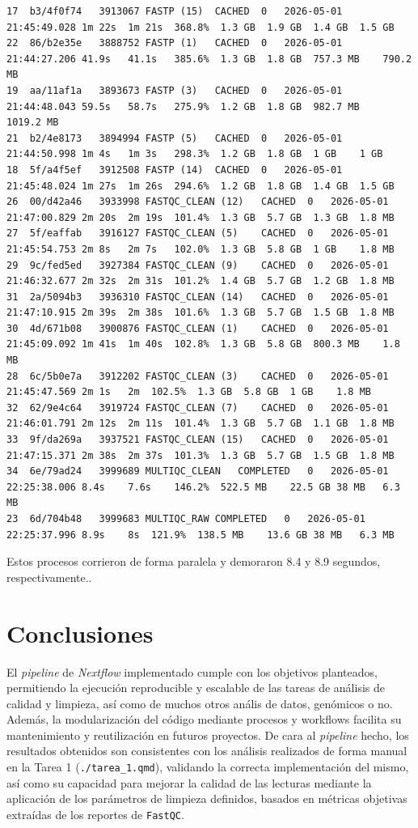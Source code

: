 \documentclass[
  letterpaper,
  DIV=11,
  numbers=noendperiod]{scrartcl}
\begin{document}
\begin{verbatim}
17  b3/4f0f74   3913067 FASTP (15)  CACHED  0   2026-05-01 21:45:49.028 1m 22s  1m 21s  368.8%  1.3 GB  1.9 GB  1.4 GB  1.5 GB
22  86/b2e35e   3888752 FASTP (1)   CACHED  0   2026-05-01 21:44:27.206 41.9s   41.1s   385.6%  1.3 GB  1.8 GB  757.3 MB    790.2 MB
19  aa/11af1a   3893673 FASTP (3)   CACHED  0   2026-05-01 21:44:48.043 59.5s   58.7s   275.9%  1.2 GB  1.8 GB  982.7 MB    1019.2 MB
21  b2/4e8173   3894994 FASTP (5)   CACHED  0   2026-05-01 21:44:50.998 1m 4s   1m 3s   298.3%  1.2 GB  1.8 GB  1 GB    1 GB
18  5f/a4f5ef   3912508 FASTP (14)  CACHED  0   2026-05-01 21:45:48.024 1m 27s  1m 26s  294.6%  1.2 GB  1.8 GB  1.4 GB  1.5 GB
26  00/d42a46   3933998 FASTQC_CLEAN (12)   CACHED  0   2026-05-01 21:47:00.829 2m 20s  2m 19s  101.4%  1.3 GB  5.7 GB  1.3 GB  1.8 MB
27  5f/eaffab   3916127 FASTQC_CLEAN (5)    CACHED  0   2026-05-01 21:45:54.753 2m 8s   2m 7s   102.0%  1.3 GB  5.8 GB  1 GB    1.8 MB
29  9c/fed5ed   3927384 FASTQC_CLEAN (9)    CACHED  0   2026-05-01 21:46:32.677 2m 32s  2m 31s  101.2%  1.4 GB  5.7 GB  1.2 GB  1.8 MB
31  2a/5094b3   3936310 FASTQC_CLEAN (14)   CACHED  0   2026-05-01 21:47:10.915 2m 39s  2m 38s  101.6%  1.3 GB  5.7 GB  1.5 GB  1.8 MB
30  4d/671b08   3900876 FASTQC_CLEAN (1)    CACHED  0   2026-05-01 21:45:09.092 1m 41s  1m 40s  102.8%  1.3 GB  5.8 GB  800.3 MB    1.8 MB
28  6c/5b0e7a   3912202 FASTQC_CLEAN (3)    CACHED  0   2026-05-01 21:45:47.569 2m 1s   2m  102.5%  1.3 GB  5.8 GB  1 GB    1.8 MB
32  62/9e4c64   3919724 FASTQC_CLEAN (7)    CACHED  0   2026-05-01 21:46:01.791 2m 12s  2m 11s  101.4%  1.3 GB  5.7 GB  1.1 GB  1.8 MB
33  9f/da269a   3937521 FASTQC_CLEAN (15)   CACHED  0   2026-05-01 21:47:15.371 2m 38s  2m 37s  101.3%  1.3 GB  5.7 GB  1.5 GB  1.8 MB
34  6e/79ad24   3999689 MULTIQC_CLEAN   COMPLETED   0   2026-05-01 22:25:38.006 8.4s    7.6s    146.2%  522.5 MB    22.5 GB 38 MB   6.3 MB
23  6d/704b48   3999683 MULTIQC_RAW COMPLETED   0   2026-05-01 22:25:37.996 8.9s    8s  121.9%  138.5 MB    13.6 GB 38 MB   6.3 MB
\end{verbatim}

Estos procesos corrieron de forma paralela y demoraron 8.4 y 8.9
segundos, respectivamente..

\section{Conclusiones}\label{conclusiones}

El \emph{pipeline} de \emph{Nextflow} implementado cumple con los
objetivos planteados, permitiendo la ejecución reproducible y escalable
de las tareas de análisis de calidad y limpieza, así como de muchos
otros anális de datos, genómicos o no. Además, la modularización del
código mediante procesos y workflows facilita su mantenimiento y
reutilización en futuros proyectos. De cara al \emph{pipeline} hecho,
los resultados obtenidos son consistentes con los análisis realizados de
forma manual en la Tarea 1 (\texttt{./tarea\_1.qmd}), validando la
correcta implementación del mismo, así como su capacidad para mejorar la
calidad de las lecturas mediante la aplicación de los parámetros de
limpieza definidos, basados en métricas objetivas extraídas de los
reportes de \texttt{FastQC}.
\end{document}
